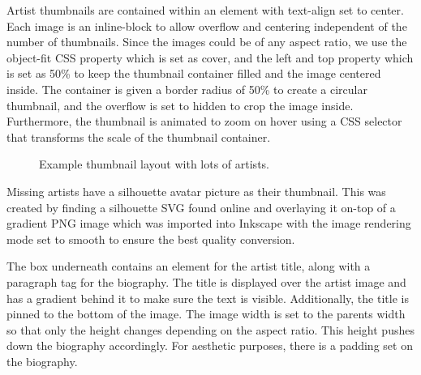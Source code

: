 \documentclass[10pt]{article}
\begin{document}
                Artist thumbnails are contained within an element with text-align set to center. Each image is an inline-block to allow overflow and centering independent of the number of thumbnails. Since the images could be of any aspect ratio, we use the object-fit CSS property which is set as cover, and the left and top property which is set as 50\% to keep the thumbnail container filled and the image centered inside. The container is given a border radius of 50\% to create a circular thumbnail, and the overflow is set to hidden to crop the image inside. Furthermore, the thumbnail is animated to zoom on hover using a CSS selector that transforms the scale of the thumbnail container.

                \begin{figure}[!ht]
                  \centering
                  \caption{Example thumbnail layout with lots of artists.}
                \end{figure}


                Missing artists have a silhouette avatar picture as their thumbnail. This was created by finding a silhouette SVG found online and overlaying it on-top of a gradient PNG image which was imported into Inkscape with the image rendering mode set to smooth to ensure the best quality conversion. 

                The box underneath contains an element for the artist title, along with a paragraph tag for the biography. The title is displayed over the artist image and has a gradient behind it to make sure the text is visible. Additionally, the title is pinned to the bottom of the image. The image width is set to the parent\textquotesingle s width so that only the height changes depending on the aspect ratio. This height pushes down the biography accordingly. For aesthetic purposes, there is a padding set on the biography.
\end{document}

